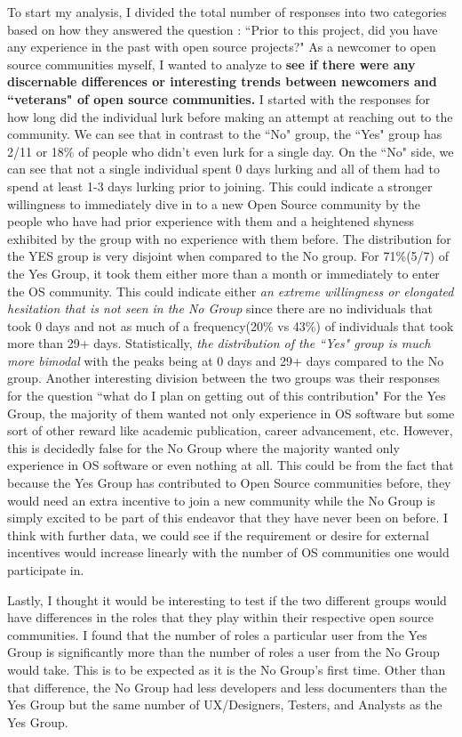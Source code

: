 To start my analysis, I divided the total number of responses into two categories based on how they answered the question : ``Prior to this project, did you have any experience in the past with open source projects?"
As a newcomer to open source communities myself, I wanted to analyze to {\bf see if there were any discernable differences or interesting trends between newcomers and ``veterans" of open source communities.} 
I started with the responses for how long did the individual lurk before making an attempt at reaching out to the community. We can see that in contrast to the ``No" group, the ``Yes" group has 2/11 or 18\% of people who didn't even lurk for a single day. On the  ``No" side, we can see that not  a single individual spent 0 days lurking and all of them had to spend at least 1-3 days lurking prior to joining.  This could indicate a stronger willingness to immediately dive in to a new Open Source community by the people who have had prior experience with them and a heightened shyness exhibited by the group with no experience with them before. The distribution for the YES  group is very disjoint when compared to the No group. For 71\%(5/7) of the Yes Group, it took them either more than a month or immediately to enter the OS community. This could indicate either {\it an extreme willingness or elongated hesitation that is not seen in the No Group} since there are no individuals that took 0 days and not as much of a frequency(20\% vs 43\%) of individuals that took more than 29+ days.  Statistically, {\it the distribution of the ``Yes" group is much more bimodal} with the peaks being at 0 days and 29+ days compared to the No group. 
 	Another interesting division between the two groups was their responses for the question ``what do  I plan on getting out of this contribution" For the Yes Group, the majority of them wanted not only experience in OS software but some sort of other reward like academic publication, career advancement, etc. However, this is decidedly false for the No Group where the majority wanted only experience in OS software or even nothing at all. This could be from the fact that because the Yes Group has contributed to Open Source communities before, they would need an extra incentive to join a new community while the No Group is simply excited to be part of this endeavor that they have never been on before. I think with further data, we could see if the requirement or desire for external incentives would increase linearly with the number of OS communities one would participate in.

Lastly, I thought it would be interesting to test if the two different groups would have differences in the roles that they play within their respective open source communities. I found that the number of roles a particular user from the Yes Group is significantly more than the number of roles a user from the No Group would take. This is to be expected as it is the No Group's first time. Other than that difference, the No Group had less developers and less documenters than the Yes Group but the same number of UX/Designers, Testers, and Analysts as the Yes Group. 
